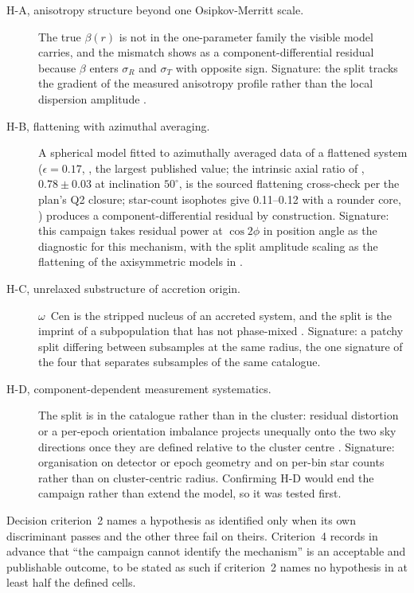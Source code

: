 \documentclass[11pt]{article}
\newcommand{\ocen}{$\omega$~Cen}
\begin{document}
\begin{description}
\item[H-A, anisotropy structure beyond one Osipkov-Merritt scale.] The true $\beta(r)$ is not in the one-parameter family the visible model carries, and the mismatch shows as a component-differential residual because $\beta$ enters $\sigma_R$ and $\sigma_T$ with opposite sign. Signature: the split tracks the gradient of the measured anisotropy profile rather than the local dispersion amplitude \citep{Zocchi2017,Zocchi2019,Aros2020}.
\item[H-B, flattening with azimuthal averaging.] A spherical model fitted to azimuthally averaged data of a flattened system ($\epsilon = 0.17$, \citealt{WhiteShawl1987}, the largest published value; the intrinsic axial ratio of \citealt{vandeVen2006}, $0.78 \pm 0.03$ at inclination $50^\circ$, is the sourced flattening cross-check per the plan's Q2 closure; star-count isophotes give 0.11--0.12 with a rounder core, \citealt{Geyer1983,Pancino2003}) produces a component-differential residual by construction. Signature: this campaign takes residual power at $\cos 2\phi$ in position angle as the diagnostic for this mechanism, with the split amplitude scaling as the flattening of the axisymmetric models in \citep{vanderMarelAnderson2010}.
\item[H-C, unrelaxed substructure of accretion origin.] \ocen{} is the stripped nucleus of an accreted system, and the split is the imprint of a subpopulation that has not phase-mixed \citep{Ibata2019,BekkiTsujimoto2019,Clontz2024}. Signature: a patchy split differing between subsamples at the same radius, the one signature of the four that separates subsamples of the same catalogue.
\item[H-D, component-dependent measurement systematics.] The split is in the catalogue rather than in the cluster: residual distortion or a per-epoch orientation imbalance projects unequally onto the two sky directions once they are defined relative to the cluster centre \citep{Haberle2024oMEGACatII,Haberle2025oMEGACatVI}. Signature: organisation on detector or epoch geometry and on per-bin star counts rather than on cluster-centric radius. Confirming H-D would end the campaign rather than extend the model, so it was tested first.
\end{description}

Decision criterion~2 names a hypothesis as identified only when its own discriminant passes and the other three fail on theirs. Criterion~4 records in advance that ``the campaign cannot identify the mechanism'' is an acceptable and publishable outcome, to be stated as such if criterion~2 names no hypothesis in at least half the defined cells.
\end{document}
